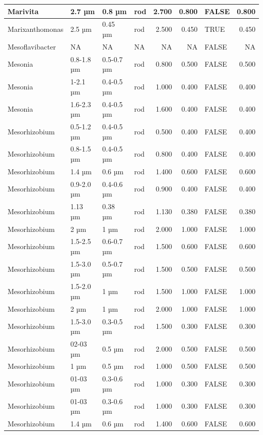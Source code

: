 \documentclass[
]{article}
\begin{document}
\begin{table}
\begin{tabular}{l|l|l|l|r|r|l|r}
\hline
Marivita & 2.7 µm & 0.8 µm & rod & 2.700 & 0.800 & FALSE & 0.800\\
\hline
Marixanthomonas & 2.5 µm & 0.45 µm & rod & 2.500 & 0.450 & TRUE & 0.450\\
\hline
Mesoflavibacter & NA & NA & NA & NA & NA & FALSE & NA\\
\hline
Mesonia & 0.8-1.8 µm & 0.5-0.7 µm & rod & 0.800 & 0.500 & FALSE & 0.500\\
\hline
Mesonia & 1-2.1 µm & 0.4-0.5 µm & rod & 1.000 & 0.400 & FALSE & 0.400\\
\hline
Mesonia & 1.6-2.3 µm & 0.4-0.5 µm & rod & 1.600 & 0.400 & FALSE & 0.400\\
\hline
Mesorhizobium & 0.5-1.2 µm & 0.4-0.5 µm & rod & 0.500 & 0.400 & FALSE & 0.400\\
\hline
Mesorhizobium & 0.8-1.5 µm & 0.4-0.5 µm & rod & 0.800 & 0.400 & FALSE & 0.400\\
\hline
Mesorhizobium & 1.4 µm & 0.6 µm & rod & 1.400 & 0.600 & FALSE & 0.600\\
\hline
Mesorhizobium & 0.9-2.0 µm & 0.4-0.6 µm & rod & 0.900 & 0.400 & FALSE & 0.400\\
\hline
Mesorhizobium & 1.13 µm & 0.38 µm & rod & 1.130 & 0.380 & FALSE & 0.380\\
\hline
Mesorhizobium & 2 µm & 1 µm & rod & 2.000 & 1.000 & FALSE & 1.000\\
\hline
Mesorhizobium & 1.5-2.5 µm & 0.6-0.7 µm & rod & 1.500 & 0.600 & FALSE & 0.600\\
\hline
Mesorhizobium & 1.5-3.0 µm & 0.5-0.7 µm & rod & 1.500 & 0.500 & FALSE & 0.500\\
\hline
Mesorhizobium & 1.5-2.0 µm & 1 µm & rod & 1.500 & 1.000 & FALSE & 1.000\\
\hline
Mesorhizobium & 2 µm & 1 µm & rod & 2.000 & 1.000 & FALSE & 1.000\\
\hline
Mesorhizobium & 1.5-3.0 µm & 0.3-0.5 µm & rod & 1.500 & 0.300 & FALSE & 0.300\\
\hline
Mesorhizobium & 02-03 µm & 0.5 µm & rod & 2.000 & 0.500 & FALSE & 0.500\\
\hline
Mesorhizobium & 1 µm & 0.5 µm & rod & 1.000 & 0.500 & FALSE & 0.500\\
\hline
Mesorhizobium & 01-03 µm & 0.3-0.6 µm & rod & 1.000 & 0.300 & FALSE & 0.300\\
\hline
Mesorhizobium & 01-03 µm & 0.3-0.6 µm & rod & 1.000 & 0.300 & FALSE & 0.300\\
\hline
Mesorhizobium & 1.4 µm & 0.6 µm & rod & 1.400 & 0.600 & FALSE & 0.600\\

\end{tabular}
\end{table}
\end{document}
